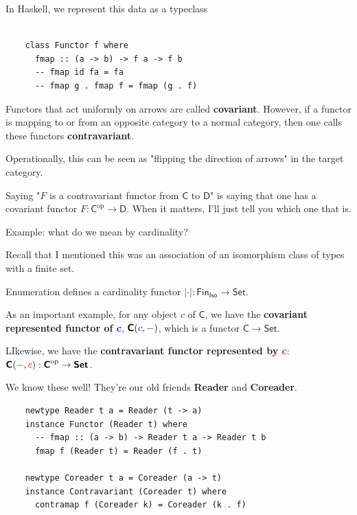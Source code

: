 \documentclass[tikz]{beamer}
\newcommand{\cat}[1]{\bm{ \mathsf{#1} }}
\newcommand{\cc}{\cat{C}}
\newcommand{\dd}{\cat{D}}
\newcommand{\op}[1]{#1^{\text{op}}}
\newcommand{\opc}{\op{\cc}}
\newcommand{\red}[1]{\textcolor{red}{#1}}
\newcommand{\blue}[1]{\textcolor{blue}{#1}}
\newcommand{\mblue}[1]{\textcolor{blue}{$#1$}}
\theoremstyle{definition}
\begin{document}
\begin{frame}[fragile]

In Haskell, we represent this data as a typeclass

	\begin{verbatim}
	
	class Functor f where
	  fmap :: (a -> b) -> f a -> f b
	  -- fmap id fa = fa 
	  -- fmap g . fmap f = fmap (g . f)
	\end{verbatim}
	
\end{frame}

\frame
{
	Functors that act uniformly on arrows are called \textbf{covariant}. However, if a functor is mapping to or from an opposite category to a normal category, then one calls these functors \textbf{contravariant}.
	
	 Operationally, this can be seen as "flipping the direction of arrows" in the target category. 
}

\frame
{
	Saying "$F$ is a contravariant functor from $\cc$ to $\dd$" is saying that one has a covariant functor $F : \opc \to \dd$. When it matters, I'll just tell you which one that is.

}

\frame
{
	Example: what do we mean by cardinality?
}

\frame
{
	Recall that I mentioned this was an association of an isomorphism class of types with a finite set. 
}

\frame
{
	Enumeration defines a cardinality functor $|\cdot|: \cat{Fin_{Iso}} \to \cat{Set}$.  
}

\frame
{
	As an important example, for any object \mblue{c} of $\cc$, we have the \textbf{covariant represented functor of \blue{c}}, $\cc(\blue{c}, -)$, which is a functor $\cc \to \cat{Set}$.
	
}

\frame
{

 LIkewise, we have the \textbf{contravariant functor represented by \red{c}}: $\cc(-, \red{c}) : \opc \to \cat{Set}$.

}

\frame
{
	We know these well! They're our old friends \textbf{Reader} and \textbf{Coreader}.
}

\begin{frame}[fragile]

	\begin{verbatim}
	newtype Reader t a = Reader (t -> a)
	instance Functor (Reader t) where
	  -- fmap :: (a -> b) -> Reader t a -> Reader t b
	  fmap f (Reader t) = Reader (f . t)
	  
	newtype Coreader t a = Coreader (a -> t)
	instance Contravariant (Coreader t) where
	  contramap f (Coreader k) = Coreader (k . f)
	\end{verbatim}
\end{frame}
\end{document}
